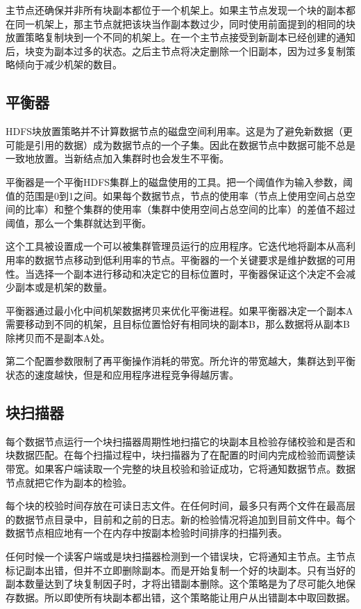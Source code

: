 主节点还确保并非所有块副本都位于一个机架上。如果主节点发现一个块的副本都在同一机架上，那主节点就把该块当作副本数过少，同时使用前面提到的相同的块放置策略复制块到一个不同的机架上。在一个主节点接受到新副本已经创建的通知后，块变为副本过多的状态。之后主节点将决定删除一个旧副本，因为过多复制策略倾向于减少机架的数目。

\subsection{平衡器}

HDFS块放置策略并不计算数据节点的磁盘空间利用率。这是为了避免新数据（更可能是引用的数据）成为数据节点的一个子集。因此在数据节点中数据可能不总是一致地放置。当新结点加入集群时也会发生不平衡。

平衡器是一个平衡HDFS集群上的磁盘使用的工具。把一个阈值作为输入参数，阈值的范围是0到1之间。如果每个数据节点，节点的使用率（节点上使用空间占总空间的比率）和整个集群的使用率（集群中使用空间占总空间的比率）的差值不超过阈值，那么一个集群就达到平衡。

这个工具被设置成一个可以被集群管理员运行的应用程序。它迭代地将副本从高利用率的数据节点移动到低利用率的节点。平衡器的一个关键要求是维护数据的可用性。当选择一个副本进行移动和决定它的目标位置时，平衡器保证这个决定不会减少副本或是机架的数量。

平衡器通过最小化中间机架数据拷贝来优化平衡进程。如果平衡器决定一个副本A需要移动到不同的机架，且目标位置恰好有相同块的副本B，那么数据将从副本B除拷贝而不是副本A处。

第二个配置参数限制了再平衡操作消耗的带宽。所允许的带宽越大，集群达到平衡状态的速度越快，但是和应用程序进程竞争得越厉害。

\subsection{块扫描器}

每个数据节点运行一个块扫描器周期性地扫描它的块副本且检验存储校验和是否和块数据匹配。在每个扫描过程中，块扫描器为了在配置的时间内完成检验而调整读带宽。如果客户端读取一个完整的块且校验和验证成功，它将通知数据节点。数据节点就把它作为副本的检验。

每个块的校验时间存放在可读日志文件。在任何时间，最多只有两个文件在最高层的数据节点目录中，目前和之前的日志。新的检验情况将追加到目前文件中。每个数据节点相应地有一个在内存中按副本检验时间排序的扫描列表。

任何时候一个读客户端或是块扫描器检测到一个错误块，它将通知主节点。主节点标记副本出错，但并不立即删除副本。而是开始复制一个好的块副本。只有当好的副本数量达到了块复制因子时，才将出错副本删除。这个策略是为了尽可能久地保存数据。所以即使所有块副本都出错，这个策略能让用户从出错副本中取回数据。

